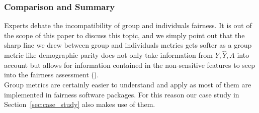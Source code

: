 

\subsubsection*{Comparison and Summary}
Experts debate the incompatibility of group and individuals fairness. %
It is out of the scope of this paper to discuss this topic, and we simply point out that the sharp line we drew between group and individuals metrics gets softer as a group metric like demographic parity does not only take information from $Y, \hat{Y}, A$ into account but allows for information contained in the non-sensitive features to seep into the fairness assessment (\cite{castelnovo2022}).\\
Group metrics are certainly easier to understand and apply as most of them are implemented in fairness software packages. For this reason our case study in Section~\ref{sec:case_study} also makes use of them.



